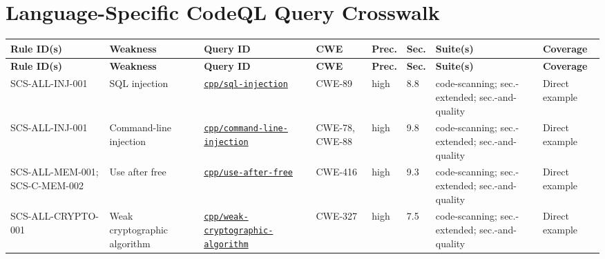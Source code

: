 \documentclass[10pt,letterpaper]{article}
\newcommand{\code}[1]{\texttt{\small #1}}
\begin{document}
\section{Language-Specific CodeQL Query Crosswalk}\begin{landscape}\scriptsize
\setlength{\tabcolsep}{2.6pt}
\begin{longtable}{@{}P{1.28in}P{1.12in}P{1.52in}P{0.78in}P{0.52in}P{0.48in}P{1.32in}P{0.82in}@{}}
\toprule
\textbf{Rule ID(s)} & \textbf{Weakness} & \textbf{Query ID} & \textbf{CWE} & \textbf{Prec.} & \textbf{Sec.} & \textbf{Suite(s)} & \textbf{Coverage}\\
\midrule
\endfirsthead
\toprule
\textbf{Rule ID(s)} & \textbf{Weakness} & \textbf{Query ID} & \textbf{CWE} & \textbf{Prec.} & \textbf{Sec.} & \textbf{Suite(s)} & \textbf{Coverage}\\
\midrule
\endhead
SCS-ALL-INJ-001 & SQL injection & \href{https://codeql.github.com/codeql-query-help/cpp/cpp-sql-injection/}{\code{cpp/sql-injection}} & CWE-89 & high & 8.8 & code-scanning; sec.-extended; sec.-and-quality & Direct example\\
SCS-ALL-INJ-001 & Command-line injection & \href{https://codeql.github.com/codeql-query-help/cpp/cpp-command-line-injection/}{\code{cpp/command-line-injection}} & CWE-78, CWE-88 & high & 9.8 & code-scanning; sec.-extended; sec.-and-quality & Direct example\\
SCS-ALL-MEM-001; SCS-C-MEM-002 & Use after free & \href{https://codeql.github.com/codeql-query-help/cpp/cpp-use-after-free/}{\code{cpp/use-after-free}} & CWE-416 & high & 9.3 & code-scanning; sec.-extended; sec.-and-quality & Direct example\\
SCS-ALL-CRYPTO-001 & Weak cryptographic algorithm & \href{https://codeql.github.com/codeql-query-help/cpp/cpp-weak-cryptographic-algorithm/}{\code{cpp/weak-cryptographic-algorithm}} & CWE-327 & high & 7.5 & code-scanning; sec.-extended; sec.-and-quality & Direct example\\
\bottomrule
\end{longtable}
\normalsize\end{landscape}
\end{document}
